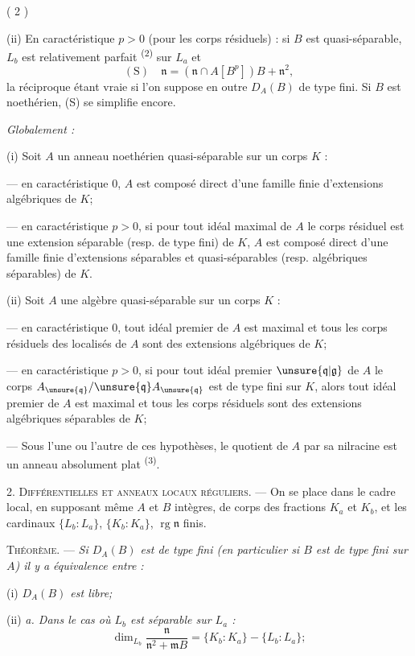 \begin{center}( 2 )\end{center}

(ii) En caractéristique $p>0$ (pour les corps résiduels) : si $B$ est quasi-séparable, $L_b$ est relativement parfait \textsuperscript{(2)} sur $L_a$ et
\[
(\mathrm S)\quad \mathfrak n=(\mathfrak n\cap A[B^p])B+\mathfrak n^2,
\]
la réciproque étant vraie si l'on suppose en outre $D_A(B)$ de type fini. Si $B$ est noethérien, (S) se simplifie encore.

\textit{Globalement :}

(i) Soit $A$ un anneau noethérien quasi-séparable sur un corps $K$ :

--- en caractéristique $0$, $A$ est composé direct d'une famille finie d'extensions algébriques de $K$;

--- en caractéristique $p>0$, si pour tout idéal maximal de $A$ le corps résiduel est une extension séparable (resp. de type fini) de $K$, $A$ est composé direct d'une famille finie d'extensions séparables et quasi-séparables (resp. algébriques séparables) de $K$.

(ii) Soit $A$ une algèbre quasi-séparable sur un corps $K$ :

--- en caractéristique $0$, tout idéal premier de $A$ est maximal et tous les corps résiduels des localisés de $A$ sont des extensions algébriques de $K$;

--- en caractéristique $p>0$, si pour tout idéal premier $\unsure{\mathfrak q|\mathfrak g}$ de $A$ le corps $A_{\unsure{\mathfrak q}}/\unsure{\mathfrak q}A_{\unsure{\mathfrak q}}$ est de type fini sur $K$, alors tout idéal premier de $A$ est maximal et tous les corps résiduels sont des extensions algébriques séparables de $K$;

--- Sous l'une ou l'autre de ces hypothèses, le quotient de $A$ par sa nilracine est un anneau absolument plat \textsuperscript{(3)}.

2. \textsc{Différentielles et anneaux locaux réguliers.} --- On se place dans le cadre local, en supposant même $A$ et $B$ intègres, de corps des fractions $K_a$ et $K_b$, et les cardinaux $\{L_b:L_a\}$, $\{K_b:K_a\}$, $\operatorname{rg}\mathfrak n$ finis.

\textsc{Théorème.} --- \textit{Si $D_A(B)$ est de type fini (en particulier si $B$ est de type fini sur $A$) il y a équivalence entre :}

(i) \textit{$D_A(B)$ est libre;}

(ii) \textit{a. Dans le cas où $L_b$ est séparable sur $L_a$ :}
\[
\dim_{L_b}\frac{\mathfrak n}{\mathfrak n^2+\mathfrak mB}=\{K_b:K_a\}-\{L_b:L_a\};
\]

